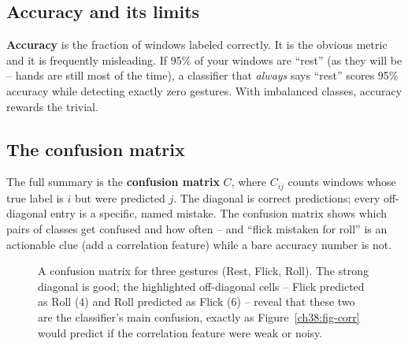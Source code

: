 \subsection{Accuracy and its limits}

\textbf{Accuracy} is the fraction of windows labeled correctly. It is the obvious
metric and it is frequently misleading. If 95\% of your windows are ``rest'' (as
they will be -- hands are still most of the time), a classifier that
\emph{always} says ``rest'' scores 95\% accuracy while detecting exactly zero
gestures. With imbalanced classes, accuracy rewards the trivial.

\subsection{The confusion matrix}

The full summary is the \textbf{confusion matrix} $C$, where $C_{ij}$ counts
windows whose true label is $i$ but were predicted $j$. The diagonal is correct
predictions; every off-diagonal entry is a specific, named mistake. The confusion
matrix shows which pairs of classes get confused and how often -- and
``flick mistaken for roll'' is an actionable clue (add a correlation feature)
while a bare accuracy number is not.

\begin{figure}[H]
\centering
{}
\caption{A confusion matrix for three gestures (Rest, Flick, Roll). The strong
diagonal is good; the highlighted off-diagonal cells -- Flick predicted as Roll
(4) and Roll predicted as Flick (6) -- reveal that these two are the classifier's
main confusion, exactly as Figure~\ref{ch38:fig-corr} would predict if the
correlation feature were weak or noisy.}
\label{ch38:fig-confusion}
\end{figure}

